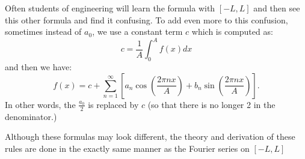 \documentclass[12pt]{report}
\begin{document}
\begin{appendices}
	 Often students of engineering will learn the formula with $[-L,L]$ and then see this other formula and find it confusing. To add even more to this confusion, sometimes instead of $a_0$, we use a constant term $c$ which is computed as:
	 $$c = \frac{1}{A} \int_0^A f(x) dx $$
	 and then we have:
	  $$f(x) = c + \sum_{n=1}^{\infty} \left[ a_n \cos \left( \frac{2\pi n x}{A} \right) + b_n \sin \left( \frac{2\pi n x}{A} \right) \right]. $$
	 In other words, the $\frac{a_0}{2}$ is replaced by $c$ (so that there is no longer 2 in the denominator.)
	 
	 Although these formulas may look different, the theory and derivation of these rules are done in the exactly same manner as the Fourier series on $[-L,L]$
\end{appendices}



















\printindex
\end{document}
